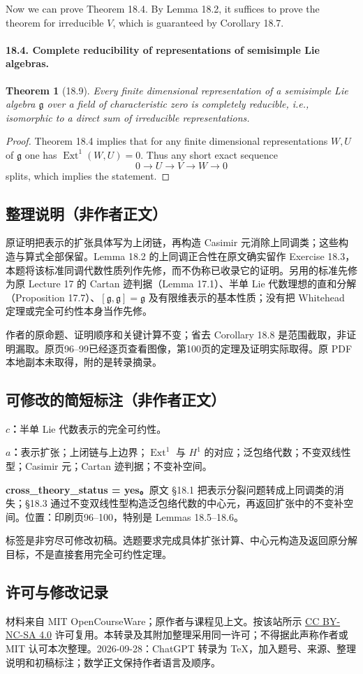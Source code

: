 \documentclass[UTF8,11pt]{ctexart}
\newtheorem*{theorem}{Theorem}
\begin{document}
Now we can prove Theorem 18.4. By Lemma 18.2, it suffices to prove the theorem for irreducible $V$, which is guaranteed by Corollary 18.7.

\paragraph{18.4. Complete reducibility of representations of semisimple Lie algebras.}
\begin{theorem}[18.9]
Every finite dimensional representation of a semisimple Lie algebra $\mathfrak g$ over a field of characteristic zero is completely reducible, i.e., isomorphic to a direct sum of irreducible representations.
\end{theorem}
\begin{proof}
Theorem 18.4 implies that for any finite dimensional representations $W,U$ of $\mathfrak g$ one has $\operatorname{Ext}^1(W,U)=0$. Thus any short exact sequence
\[
0\to U\to V\to W\to0
\]
splits, which implies the statement.
\end{proof}


\subsection*{整理说明（非作者正文）}
原证明把表示的扩张具体写为上闭链，再构造 Casimir 元消除上同调类；这些构造与算式全部保留。Lemma 18.2 的上同调正合性在原文确实留作 Exercise 18.3，本题将该标准同调代数性质列作先修，而不伪称已收录它的证明。另用的标准先修为原 Lecture 17 的 Cartan 迹判据（Lemma 17.1）、半单 Lie 代数理想的直和分解（Proposition 17.7）、$[\mathfrak g,\mathfrak g]=\mathfrak g$ 及有限维表示的基本性质；没有把 Whitehead 定理或完全可约性本身当作先修。

作者的原命题、证明顺序和关键计算不变；省去 Corollary 18.8 是范围截取，非证明漏取。原页96--99已经逐页查看图像，第100页的定理及证明实际取得。原 PDF 本地副本未取得，附的是转录摘录。

\subsection*{可修改的简短标注（非作者正文）}
\textbf{$c$：}半单 Lie 代数表示的完全可约性。

\textbf{$a$：}表示扩张；上闭链与上边界；$\operatorname{Ext}^1$ 与 $H^1$ 的对应；泛包络代数；不变双线性型；Casimir 元；Cartan 迹判据；不变补空间。

\textbf{cross\_theory\_status = yes。}原文 \S18.1 把表示分裂问题转成上同调类的消失；\S18.3 通过不变双线性型构造泛包络代数的中心元，再返回扩张中的不变补空间。位置：印刷页96--100，特别是 Lemmas 18.5--18.6。

标签是非穷尽可修改初稿。选题要求完成具体扩张计算、中心元构造及返回原分解目标，不是直接套用完全可约性定理。
\subsection*{许可与修改记录}
材料来自 MIT OpenCourseWare；原作者与课程见上文。按该站所示 \href{https://creativecommons.org/licenses/by-nc-sa/4.0/}{CC BY-NC-SA 4.0} 许可复用。本转录及其附加整理采用同一许可；不得据此声称作者或 MIT 认可本次整理。2026-09-28：ChatGPT 转录为 TeX，加入题号、来源、整理说明和初稿标注；数学正文保持作者语言及顺序。
\end{document}
